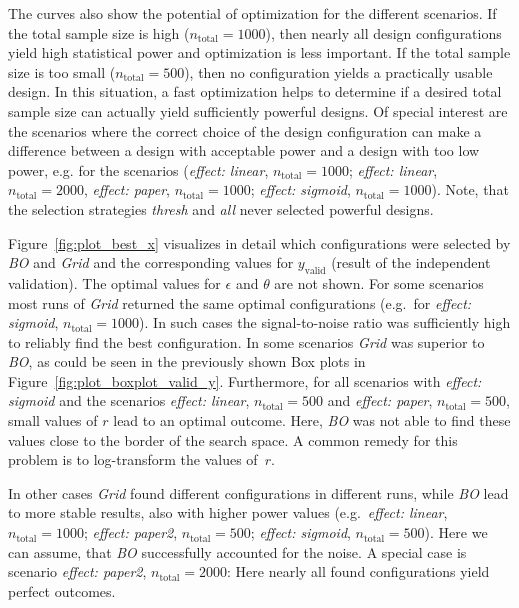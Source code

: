 \documentclass[bimj,fleqn]{w-art}
\theoremstyle{plain}
\theoremstyle{definition}
\begin{document}
The curves also show the potential of optimization for the different scenarios.
If the total sample size is high ($n_{\text{total}} = 1000$), then nearly all design configurations yield high statistical power and optimization is less important.
If the total sample size is too small ($n_{\text{total}} = 500$), then no configuration yields a practically usable design.
In this situation, a fast optimization helps to determine if a desired total sample size can actually yield sufficiently powerful designs.
Of special interest are the scenarios where the correct choice of the design configuration can make a difference between a design with acceptable power and a design with too low power, e.g. for the scenarios (\emph{effect: linear}, $n_{\text{total}} = 1000$; \emph{effect: linear}, $n_{\text{total}} = 2000$, \emph{effect: paper}, $n_{\text{total}} = 1000$; \emph{effect: sigmoid}, $n_{\text{total}} = 1000$).
Note, that the selection strategies \emph{thresh} and \emph{all} never selected powerful designs.



Figure~\ref{fig:plot_best_x} visualizes in detail which configurations were selected by \emph{BO} and \emph{Grid} and the corresponding values for $y_{\text{valid}}$ (result of the independent validation).
The optimal values for $\epsilon$ and $\theta$ are not shown.
For some scenarios most runs of \emph{Grid} returned the same optimal configurations (e.g.\ for \emph{effect: sigmoid}, $n_{\text{total}} = 1000$).
In such cases the signal-to-noise ratio was sufficiently high to reliably find the best configuration.
In some scenarios \emph{Grid} was superior to \emph{BO}, as could be seen in the previously shown Box plots in Figure~\ref{fig:plot_boxplot_valid_y}.
Furthermore, for all scenarios with \emph{effect: sigmoid} and the scenarios \emph{effect: linear}, $n_{\text{total}} = 500$ and \emph{effect: paper}, $n_{\text{total}} = 500$, small values of $r$ lead to an optimal outcome.
Here, \emph{BO} was not able to find these values close to the border of the search space.
A common remedy for this problem is to log-transform the values of~$r$.

In other cases \emph{Grid} found different configurations in different runs, while \emph{BO} lead to more stable results, also with higher power values (e.g.\ \emph{effect: linear}, $n_{\text{total}} = 1000$; \emph{effect: paper2}, $n_{\text{total}} = 500$; \emph{effect: sigmoid}, $n_{\text{total}} = 500$).
Here we can assume, that \emph{BO} successfully accounted for the noise.
A special case is scenario \emph{effect: paper2}, $n_{\text{total}} = 2000$:
Here nearly all found configurations yield perfect outcomes.
\end{document}
